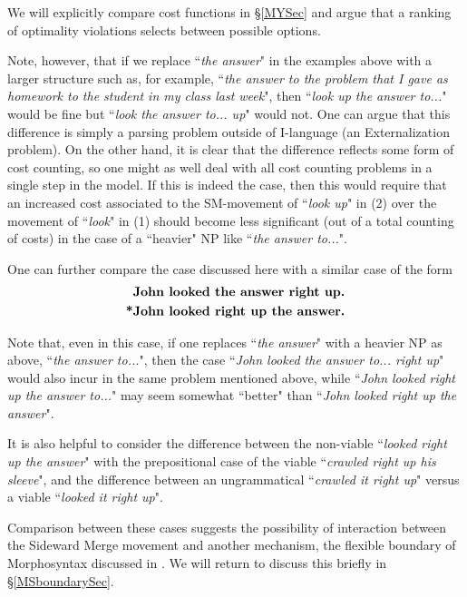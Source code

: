 \documentclass[12pt]{amsart}
\numberwithin{equation}{section}
\begin{document}
We will explicitly compare cost functions in \S \ref{MYSec} and argue that 
a ranking of optimality violations selects between possible options.

\smallskip

Note, however, that if we replace ``{\em the answer}" in the examples above with a 
larger structure such as, for example, ``{\em the answer to the problem that I gave 
as homework to the student in my class last week}", then ``{\em look up the answer to...}"
would be fine but ``{\em look the answer to... up}" would not. One can argue that this
difference is simply a parsing problem outside of I-language (an Externalization problem).
On the other hand, it is clear that the difference reflects some form of cost counting,
so one might as well deal with all cost counting problems in a single step in the model.
If this is indeed the case, then this would require that an increased cost associated
to the SM-movement of ``{\em look up}" in (2) over the movement of ``{\em look}" in (1) should 
become less significant (out of a total counting of costs) in the case of a ``heavier" NP like ``{\em the answer to...}". 

\smallskip

One can further compare the case discussed here with a similar case of the form
\begin{align*}
\text{\bf John looked the answer right up.} \\
\text{\bf *John looked right up the answer.}
\end{align*}

Note that, even in this case, if one replaces ``{\em the answer}" with
a heavier NP as above, ``{\em the answer to...}", then the case ``{\em John looked the answer to... right up}"
would also incur in the same problem mentioned above, while ``{\em John looked right up the answer to...}"
may seem somewhat ``better" than ``{\em John looked right up the answer}". 

It is also helpful to consider the difference between the non-viable ``{\em *looked right up the answer}" with 
the prepositional case of the viable  ``{\em crawled right up his sleeve}", and the difference 
between an ungrammatical   ``{\em *crawled it right up}" versus a viable ``{\em looked it right up}".

\smallskip

Comparison between these cases suggests the possibility of interaction between
the Sideward Merge movement and another mechanism, the flexible boundary of
Morphosyntax discussed in \cite{SentMar}. We will return to discuss this briefly in \S \ref{MSboundarySec}. 
\end{document}
